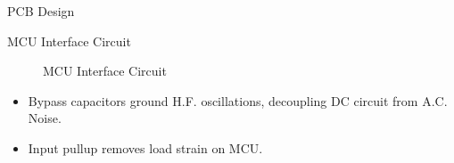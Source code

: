\begin{frame}{PCB Design}
	\begin{figure}
		\centering


	\end{figure}
\end{frame}



\begin{frame}{MCU Interface Circuit}
	\begin{figure}
		\centering


		\caption{MCU Interface Circuit}
	\end{figure}

	\begin{itemize}
		\item Bypass capacitors ground H.F. oscillations, decoupling DC circuit from A.C. Noise.
		\item Input pullup removes load strain on MCU.
	\end{itemize}
\end{frame}



